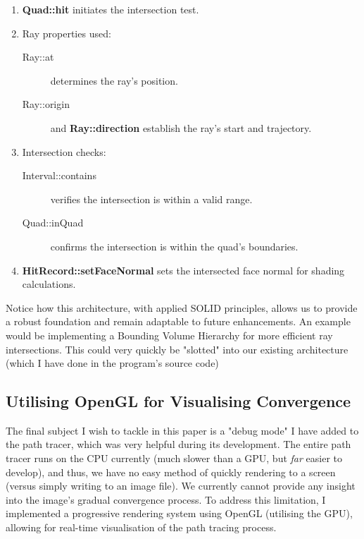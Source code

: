 \documentclass[12pt]{article}
\begin{document}
\begin{enumerate}
    \item \textbf{Quad::hit} initiates the intersection test.

    \item Ray properties used:
          \begin{description}
              \item[Ray::at] determines the ray's position.
              \item[Ray::origin] and \textbf{Ray::direction} establish the ray's start and trajectory.
          \end{description}

    \item Intersection checks:
          \begin{description}
              \item[Interval::contains] verifies the intersection is within a valid range.
              \item[Quad::inQuad] confirms the intersection is within the quad's boundaries.
          \end{description}

    \item \textbf{HitRecord::setFaceNormal} sets the intersected face normal for shading calculations.
\end{enumerate}

Notice how this architecture, with applied SOLID principles, allows us to provide a robust foundation and remain adaptable to future enhancements. An example would be implementing a Bounding Volume Hierarchy for more efficient ray intersections. This could very quickly be "slotted" into our existing architecture (which I have done in the program's source code)

\subsection{Utilising OpenGL for Visualising Convergence}


The final subject I wish to tackle in this paper is a "debug mode" I have added to the path tracer, which was very helpful during its development. The entire path tracer runs on the CPU currently (much slower than a GPU, but \textit{far} easier to develop), and thus, we have no easy method of quickly rendering to a screen (versus simply writing to an image file). We currently cannot provide any insight into the image's gradual convergence process. To address this limitation, I implemented a progressive rendering system using OpenGL (utilising the GPU), allowing for real-time visualisation of the path tracing process.
\end{document}
